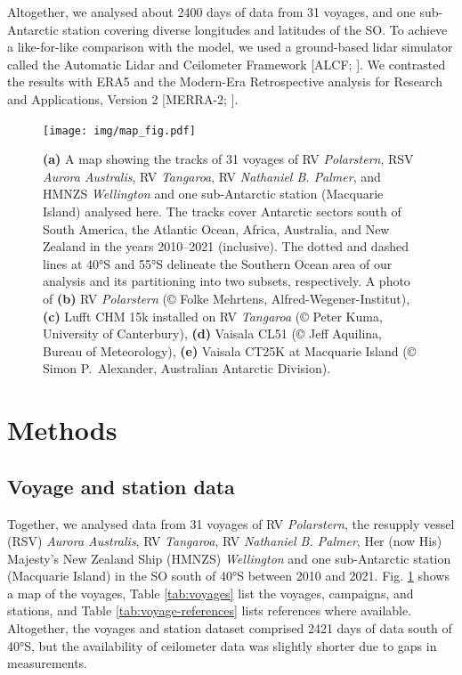 \documentclass[12pt,a4paper]{article}
\begin{document}
Altogether, we analysed about 2400 days of data from 31 voyages, and one
sub-Antarctic station covering diverse longitudes and latitudes of the SO. To
achieve a like-for-like comparison with the model, we used a ground-based lidar
simulator called the Automatic Lidar and Ceilometer Framework [ALCF;
\cite{kuma2021}]. We contrasted the results with ERA5 \citep{era5} and the
Modern-Era Retrospective analysis for Research and Applications, Version 2
[MERRA-2; \cite{gelaro2017}].

\begin{figure}[b!]
\centering
\texttt{[image: img/map\_fig.pdf]}
\caption{
\textbf{(a)} A map showing the tracks of 31 voyages of RV \emph{Polarstern},
RSV \emph{Aurora Australis}, RV \emph{Tangaroa}, RV \emph{Nathaniel B. Palmer},
and HMNZS \emph{Wellington} and one sub-Antarctic station (Macquarie Island)
analysed here. The tracks cover Antarctic sectors south of South America, the
Atlantic Ocean, Africa, Australia, and New Zealand in the years 2010--2021
(inclusive).  The dotted and dashed lines at 40°S and 55°S delineate the
Southern Ocean area of our analysis and its partitioning into two subsets,
respectively.  A photo of \textbf{(b)} RV \emph{Polarstern} (© Folke Mehrtens,
Alfred-Wegener-Institut), \textbf{(c)} Lufft CHM 15k installed on RV
\emph{Tangaroa} (© Peter Kuma, University of Canterbury), \textbf{(d)} Vaisala
CL51 (© Jeff Aquilina, Bureau of Meteorology), \textbf{(e)} Vaisala CT25K at
Macquarie Island (© Simon P.\ Alexander, Australian Antarctic Division).
}
\label{fig:map}
\end{figure}

\section{Methods}
\label{sec:methods}

\subsection{Voyage and station data}

Together, we analysed data from 31 voyages of RV \emph{Polarstern}, the
resupply vessel (RSV) \emph{Aurora Australis}, RV \emph{Tangaroa}, RV
\emph{Nathaniel B.  Palmer}, Her (now His) Majesty's New Zealand Ship (HMNZS)
\emph{Wellington} and one sub-Antarctic station (Macquarie Island) in the SO
south of 40°S between 2010 and 2021. Fig. \ref{fig:map} shows a map of the
voyages, Table \ref{tab:voyages} list the voyages, campaigns, and stations, and
Table \ref{tab:voyage-references} lists references where available. Altogether,
the voyages and station dataset comprised 2421 days of data south of 40°S, but
the availability of ceilometer data was slightly shorter due to gaps in
measurements.
\end{document}
